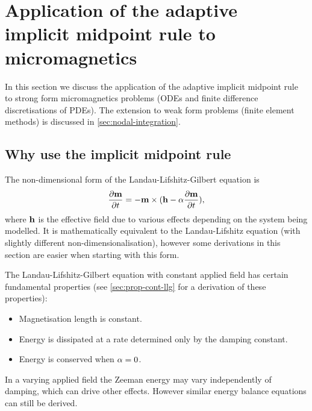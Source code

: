 





\chapter{Application of the adaptive implicit midpoint rule to micromagnetics}
\label{sec:aimr-llg}

In this section we discuss the application of the adaptive implicit midpoint rule to strong form micromagnetics problems (\ie ODEs and finite difference discretisations of PDEs).
The extension to weak form problems (finite element methods) is discussed in \autoref{sec:nodal-integration}.

\section{Why use the implicit midpoint rule}

The non-dimensional form of the Landau-Lifshitz-Gilbert equation is
\begin{equation}
  \label{eq:llg-prop-form}
  \frac{\partial \mathbf{m}}{\partial t} = - \mathbf{m} \times( \mathbf{h} - \alpha \frac{\partial \mathbf{m}}{\partial t}),
\end{equation}
where $\mathbf{h}$ is the effective field due to various effects depending on the system being modelled.
It is mathematically equivalent to the Landau-Lifshitz equation (with slightly different non-dimensionalisation), however some derivations in this section are easier when starting with this form.

The Landau-Lifshitz-Gilbert equation with constant applied field has certain fundamental properties (see \autoref{sec:prop-cont-llg} for a derivation of these properties):
\begin{itemize}
\item Magnetisation length is constant.
\item Energy is dissipated at a rate determined only by the damping constant.
\item Energy is conserved when $\alpha = 0$.
\end{itemize}
In a varying applied field the Zeeman energy may vary independently of damping, which can drive other effects.
However similar energy balance equations can still be derived.

